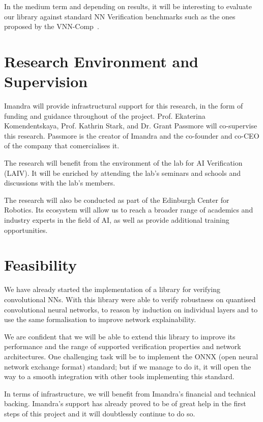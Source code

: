 \documentclass[]{article}
\begin{document}
In the medium term and depending on results, it will be interesting to evaluate our library against standard NN Verification benchmarks such as the ones proposed by the VNN-Comp~\cite{noauthor_vnn_nodate}.

\section{Research Environment and Supervision}

Imandra will provide infrastructural support for this research, in the form of funding and guidance throughout of the project.
Prof. Ekaterina Komendentskaya, Prof. Kathrin Stark, and Dr. Grant Passmore will co-supervise this research. Passmore is the creator of Imandra and the co-founder and co-CEO of the company that comercialises it.

The research will benefit from the environment of the lab for AI Verification (LAIV). It will be enriched by attending the lab's seminars and schools and discussions with the lab's members.
 
The research will also be conducted as part of the Edinburgh Center for Robotics. Its ecosystem will allow us to reach a broader range of academics and industry experts in the field of AI, as well as provide additional training opportunities.


\section{Feasibility}
We have already started the implementation of a library for verifying convolutional NNs. With this library were able to verify robustness on quantised convolutional neural networks, to reason by induction on individual layers and to use the same formalisation to improve network explainability.

We are confident that we will be able to extend this library to improve its performance and the range of supported verification properties and network architectures. One challenging task will be to implement the ONNX (open neural network exchange format) standard; but if we manage to do it, it will open the way to a smooth integration with other tools implementing this standard. 

In terms of infrastructure, we will benefit from Imandra's financial and technical backing. Imandra's support has already proved to be of great help in the first steps of this project and it will doubtlessly continue to do so.
\end{document}
